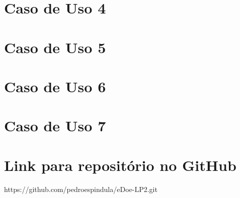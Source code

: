 \documentclass[journal,12pt,onecolumn,draftclsnofoot,]{article}
\begin{document}
	
	\section{Caso de Uso 4}
		
	
	\section{Caso de Uso 5}
	
	
	\section{Caso de Uso 6}

	
	\section{Caso de Uso 7}	
		
	
	\section{Link para repositório no GitHub}
	https://github.com/pedroespindula/eDoe-LP2.git
	
\end{document}

